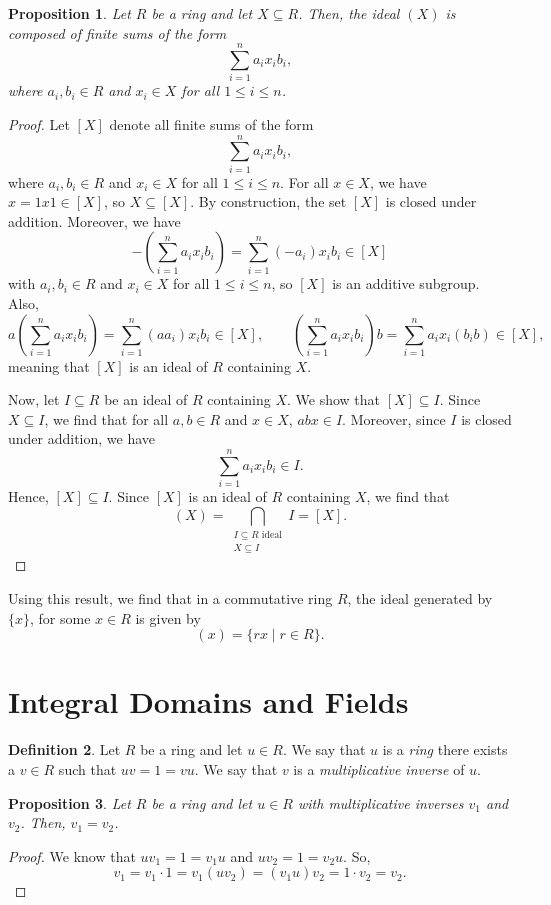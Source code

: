 \documentclass[a4paper, openany]{memoir}
\theoremstyle{definition}
\newtheorem{definition}{Definition}[section]
\theoremstyle{plain}
\newtheorem{proposition}[definition]{Proposition}
\begin{document}
    \begin{proposition}
        Let $R$ be a ring and let $X \subseteq R$. Then, the ideal $(X)$ is composed of finite sums of the form
        \[\sum_{i=1}^n a_i x_i b_i,\]
        where $a_i, b_i \in R$ and $x_i \in X$ for all $1 \leq i \leq n$.
    \end{proposition}
    \begin{proof}
        Let $[X]$ denote all finite sums of the form 
        \[\sum_{i=1}^n a_i x_i b_i,\]
        where $a_i, b_i \in R$ and $x_i \in X$ for all $1 \leq i \leq n$. For all $x \in X$, we have $x = 1x1 \in [X]$, so $X \subseteq [X]$. By construction, the set $[X]$ is closed under addition. Moreover, we have
        \[-\left(\sum_{i=1}^n a_i x_i b_i\right) = \sum_{i=1}^n (-a_i) x_i b_i \in [X]\]
        with $a_i, b_i \in R$ and $x_i \in X$ for all $1 \leq i \leq n$, so $[X]$ is an additive subgroup. Also, 
        \[a \left(\sum_{i=1}^n a_i x_i b_i\right) = \sum_{i=1}^n (a a_i) x_i b_i \in [X], \qquad \left(\sum_{i=1}^n a_i x_i b_i\right)b = \sum_{i=1}^n a_i x_i (b_i b) \in [X],\]
        meaning that $[X]$ is an ideal of $R$ containing $X$.

        Now, let $I \subseteq R$ be an ideal of $R$ containing $X$. We show that $[X] \subseteq I$. Since $X \subseteq I$, we find that for all $a, b \in R$ and $x \in X$, $abx \in I$. Moreover, since $I$ is closed under addition, we have
        \[\sum_{i=1}^n a_i x_i b_i \in I.\]
        Hence, $[X] \subseteq I$. Since $[X]$ is an ideal of $R$ containing $X$, we find that
        \[(X) = \bigcap_{\substack{I \subseteq R \textrm{ ideal} \\ X \subseteq I}} I = [X].\]
    \end{proof}
    \noindent Using this result, we find that in a commutative ring $R$, the ideal generated by $\{x\}$, for some $x \in R$ is given by
    \[(x) = \{rx \mid r \in R\}.\]
    \newpage

    \section{Integral Domains and Fields}
    \begin{definition}
        Let $R$ be a ring and let $u \in R$. We say that $u$ is a \emph{ring} there exists a $v \in R$ such that $uv = 1 = vu$. We say that $v$ is a \emph{multiplicative inverse} of $u$.
    \end{definition}

    \begin{proposition}
        Let $R$ be a ring and let $u \in R$ with multiplicative inverses $v_1$ and $v_2$. Then, $v_1 = v_2$.
    \end{proposition}
    \begin{proof}
        We know that $uv_1 = 1 = v_1 u$ and $uv_2 = 1 = v_2 u$. So,
        \[v_1 = v_1 \cdot 1 = v_1 (u v_2) = (v_1 u) v_2 = 1 \cdot v_2 = v_2.\]
    \end{proof}
\end{document}
